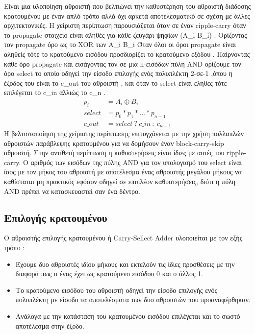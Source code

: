 Είναι μια υλοποίηση αθροιστή που βελτιώνει την καθυστέρηση του αθροιστή διάδοσης κρατουμένου με έναν απλό τρόπο αλλά όχι αρκετά αποτελεσματικό σε σχέση με άλλες αρχιτεκτονικές. 
Η χείριστη περίπτωση παρουσιάζεται όταν σε έναν ripple-carry όταν το propagate στοιχείο είναι αληθές για κάθε ζευγάρι ψηφίων (A\_i B\_i) .
Ορίζοντας τον propagate όρο ως το XOR των Α\_i B\_i 
Όταν όλοι οι όροι propagate είναι αληθείς τότε το κρατούμενο εισόδου προσδιορίζει το κρατούμενο εξόδου .
Παίρνοντας κάθε όρο propagate και εισάγοντας τον σε μια n-εισόδων πύλη AND ορίζουμε τον όρο select το οποίο οδηγεί την είσοδο επιλογής ενός πολυπλέκτη 2-σε-1 ,όπου η έξοδος του είναι το c\_out του αθροιστή , και όταν το select είναι εληθες τότε επιλέγεται το c\_in αλλιώς το c\_n .
\begin{equation}
\begin{split}
    p_i &= A_i \oplus B_i \\
    select &= p_0 * p_1 * ... * p_{n-1} \\
    c\_out &= select\ ?\ c\_in\ :\ c_{n-1} %
\end{split}
\end{equation}
Η βελτιστοποίηση της χείριστης περίπτωσης επιτυγχάνεται με την χρήση πολλαπλών αθροιστών παράβλεψης κρατουμένου για να δομήσουν έναν block-carry-skip αθροιστή. Στην αντίθετή περίπτωση η καθυστερήσεις είναι ίδιες με αυτές του ripple-carry.
Ο αριθμός των εισόδων της πύλης AND για τον υπολογισμό του select είναι ίσος με τον μήκος του αθροιστή με αποτέλεσμα ένας αθροιστής μεγάλου μήκους να καθίσταται μη πρακτικός εφόσον οδηγεί σε επιπλέον καθυστερήσεις, διότι η πύλη AND πρέπει να κατασκευαστεί σαν ένα δέντρο.   



\subsection{Επιλογής κρατουμένου}
Ο αθροιστής επιλογής κρατουμένου ή Carry-Sellect Adder υλοποιείται με τον εξής τρόπο :
\begin{itemize}
  \item Έχουμε δυο αθροιστές ιδίου μήκους και εκτελούν τις ίδιες προσθέσεις με την διαφορά πως ο ένας έχει ως κρατούμενο εισόδου 0 και ο άλλος 1.
  \item Το κρατούμενο εισόδου του αθροιστή οδηγεί την είσοδο επιλογής ενός πολυπλέκτη με είσοδο τα αποτελέσματα των δυο αθροιστών που προαναφέρθηκαν.
  \item Ανάλογα με την κατάσταση του κρατουμένου εισόδου επιλέγεται και το σωστό αποτέλεσμα στην έξοδο.
\end{itemize} 



